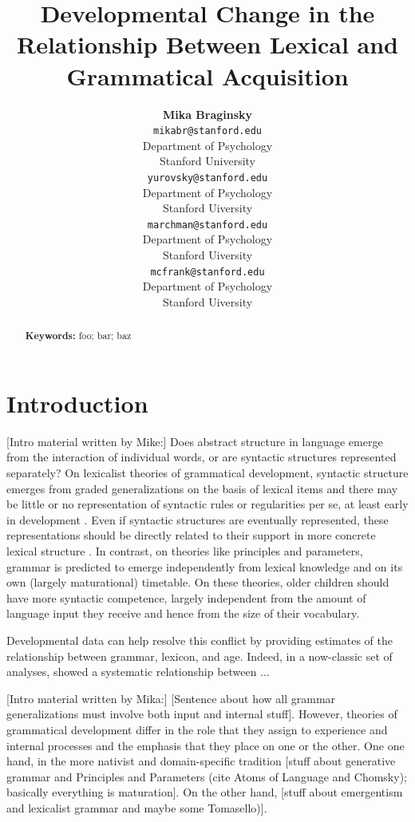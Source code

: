\documentclass[10pt,letterpaper]{article}
\title{Developmental Change in the Relationship Between Lexical and Grammatical Acquisition}
\author{{\large \bf Mika Braginsky} \\
  \texttt{mikabr@stanford.edu} \\
  Department of Psychology \\
  Stanford University
  \And {\large \bf Daniel Yurovsky} \\
  \texttt{yurovsky@stanford.edu} \\
  Department of Psychology \\
  Stanford Uiversity
    \And {\large \bf Virginia Marchman} \\
    \texttt{marchman@stanford.edu} \\
  Department of Psychology \\
  Stanford Uiversity
    \And {\large \bf Michael C. Frank}\\
    \texttt{mcfrank@stanford.edu} \\
  Department of Psychology \\
  Stanford Uiversity}
\begin{document}
\maketitle

\begin{abstract}
\lipsum[1]

\textbf{Keywords:} 
foo; bar; baz
\end{abstract}

\section{Introduction}

[Intro material written by Mike:]
Does abstract structure in language emerge from the interaction of individual words, or are syntactic structures represented separately? On lexicalist theories of grammatical development, syntactic structure emerges from graded generalizations on the basis of lexical items and there may be little or no representation of syntactic rules or regularities per se, at least early in development \cite{tomasello2000,tomasello2003}. Even if syntactic structures are eventually represented, these representations should be directly related to their support in more concrete lexical structure \cite{bannard2009,bod2010}. In contrast, on theories like principles and parameters, grammar is predicted to emerge independently from lexical knowledge and on its own (largely maturational) timetable. On these theories, older children should have more syntactic competence, largely independent from the amount of language input they receive and hence from the size of their vocabulary.

Developmental data can help resolve this conflict by providing estimates of the relationship between grammar, lexicon, and age. Indeed, in a now-classic set of analyses, \cite{bates1994} showed a systematic relationship between ...

[Intro material written by Mika:]
[Sentence about how all grammar generalizations must involve both input and internal stuff]. However, theories of grammatical development differ in the role that they assign to experience and internal processes and the emphasis that they place on one or the other. One one hand, in the more nativist and domain-specific tradition [stuff about generative grammar and Principles and Parameters (cite Atoms of Language and Chomsky); basically everything is maturation]. On the other hand, [stuff about emergentism and lexicalist grammar \cite{bates1999} and maybe some Tomasello)].
\end{document}
